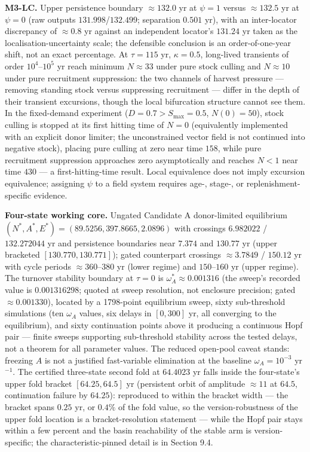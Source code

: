 \documentclass[11pt]{article}
\begin{document}
\textbf{M3-LC.} Upper persistence boundary \(\approx132.0\) yr at
\(\psi = 1\) versus \(\approx132.5\) yr at \(\psi = 0\) (raw outputs
\(131.998\)/\(132.499\); separation \(0.501\) yr), with an inter-locator
discrepancy of \(\approx0.8\) yr against an independent locator's
\(131.24\) yr taken as the localisation-uncertainty scale; the
defensible conclusion is an order-of-one-year shift, not an exact
percentage. At \(\tau = 115\) yr, \(\kappa = 0.5\), long-lived
transients of order \(10^4\)--\(10^5\) yr reach minimum \(N \approx 33\)
under pure stock culling and \(N \approx 10\) under pure recruitment
suppression: the two channels of harvest pressure --- removing standing
stock versus suppressing recruitment --- differ in the depth of their
transient excursions, though the local bifurcation structure cannot see
them. In the fixed-demand experiment (\(D = 0.7 > S_{\max} = 0.5\),
\(N(0) = 50\)), stock culling is stopped at its first hitting time of
\(N = 0\) (equivalently implemented with an explicit donor limiter; the
unconstrained vector field is not continued into negative stock),
placing pure culling at zero near time \(158\), while pure recruitment
suppression approaches zero asymptotically and reaches \(N < 1\) near
time \(430\) --- a first-hitting-time result. Local equivalence does not
imply excursion equivalence; assigning \(\psi\) to a field system
requires age-, stage-, or replenishment-specific evidence.

\textbf{Four-state working core.} Ungated Candidate A donor-limited
equilibrium \((N^*, A^*, E^*) = (89.5256, 397.8665, 2.0896)\) with
crossings \(6.982022\) / \(132.272044\) yr and persistence boundaries
near \(7.374\) and \(130.77\) yr (upper bracketed
\([130.770, 130.771]\)); gated counterpart crossings \(\approx3.7849\) /
\(150.12\) yr with cycle periods \(\approx360\)--\(380\) yr (lower
regime) and \(150\)--\(160\) yr (upper regime). The turnover stability
boundary at \(\tau = 0\) is \(\omega_A^* \approx 0.001316\) (the sweep's
recorded value is \(0.001316298\); quoted at sweep resolution, not
enclosure precision; gated \(\approx0.001330\)), located by a 1798-point
equilibrium sweep, sixty sub-threshold simulations (ten \(\omega_A\)
values, six delays in \([0, 300]\) yr, all converging to the
equilibrium), and sixty continuation points above it producing a
continuous Hopf pair --- finite sweeps supporting sub-threshold
stability across the tested delays, not a theorem for all parameter
values. The reduced open-pool caveat stands: freezing \(A\) is not a
justified fast-variable elimination at the baseline
\(\omega_A = 10^{-3}\) yr\(^{-1}\). The certified three-state second
fold at \(64.4023\) yr falls inside the four-state's upper fold bracket
\([64.25, 64.5]\) yr (persistent orbit of amplitude \(\approx11\) at
\(64.5\), continuation failure by \(64.25\)): reproduced to within the
bracket width --- the bracket spans \(0.25\) yr, or \(0.4\%\) of the
fold value, so the version-robustness of the upper fold location is a
bracket-resolution statement --- while the Hopf pair stays within a few
percent and the basin reachability of the stable arm is
version-specific; the characteristic-pinned detail is in Section 9.4.
\end{document}
